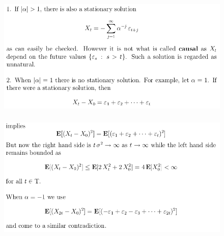 \documentclass[c, dvipsnames, 8pt]{beamer}
\begin{document}
\begin{frame}[shrink=5]
	
	
	
	\frametitle{\insertsection} 
	\begin{figure}
		\centering
		\includegraphics[width=1\linewidth]{screenshot028}
		\label{fig:screenshot001}
	\end{figure}
	
	
	\frametitle{\insertsection} 
	\begin{figure}
		\centering
		\includegraphics[width=1\linewidth]{screenshot029}
		\label{fig:screenshot001}
	\end{figure}
	
	
\end{frame}
\end{document}
